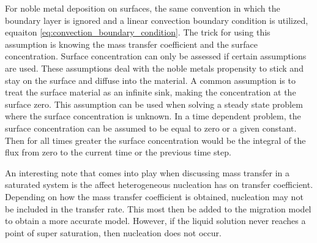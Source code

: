 For noble metal deposition on surfaces, the same convention in which the boundary layer is ignored and a linear convection boundary condition is utilized, equaiton \ref{eq:convection_boundary_condition}. The trick for using this assumption is knowing the mass transfer coefficient  and the surface concentration. Surface concentration can only be assessed if certain assumptions are used. These assumptions deal with the noble metals propensity to stick and stay on the surface and diffuse into the material. A common assumption is to treat the surface material as an infinite sink, making the concentration at the surface zero. This assumption can be used when solving a steady state problem where the surface concentration is unknown. In a time dependent problem, the surface concentration can be assumed to be equal to zero or a given constant. Then for all times greater the surface concentration would be the integral of the flux from zero to the current time or the previous time step. 

An interesting note that comes into play when discussing mass transfer in a saturated system is the affect heterogeneous nucleation has on transfer coefficient. Depending on how the mass transfer coefficient is obtained, nucleation may not be included in the transfer rate. This most then be added to the migration model to obtain a more accurate model. However, if the liquid solution never reaches a point of super saturation, then nucleation does not occur. 







